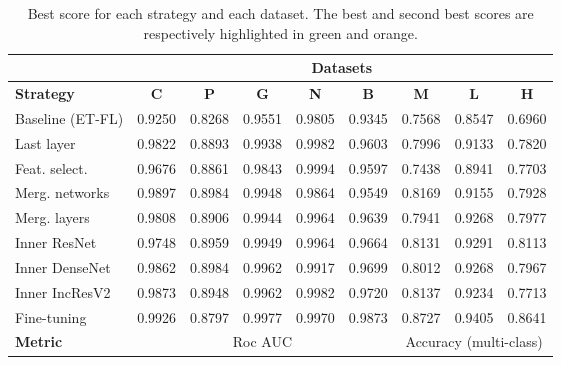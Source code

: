 \begin{table}
    \center
    \small
    \begin{tabular}{|l||c|c|c|c|c||c|c|c|}   
      \hline 
      & \multicolumn{8}{c|}{\textbf{Datasets}} \\
      \hline 
      \textbf{Strategy} & \textbf{C} & \textbf{P} & \textbf{G} & \textbf{N} & \textbf{B} & \textbf{M} & \textbf{L} & \textbf{H} \\
      \hline
      Baseline (ET-FL)      & 0.9250 & 0.8268 & 0.9551 & 0.9805	& 0.9345 & 0.7568 & 0.8547 & 0.6960 \\
      Last layer    & 0.9822 & 0.8893 & 0.9938 & \cellcolor{Dandelion}0.9982 & 0.9603 & 0.7996 & 0.9133	& 0.7820 \\
      Feat. select.	& 0.9676	& 0.8861	& 0.9843	& \cellcolor{LimeGreen}0.9994	& 0.9597	& 0.7438	& 0.8941	& 0.7703 \\
      Merg. networks	& \cellcolor{Dandelion}0.9897	& \cellcolor{LimeGreen}0.8984	& 0.9948	& 0.9864	& 0.9549	& \cellcolor{Dandelion}0.8169	& 0.9155	& 0.7928 \\
      Merg. layers	& 0.9808	& 0.8906	& 0.9944	& 0.9964	& 0.9639	& 0.7941	& 0.9268	& 0.7977 \\
      Inner ResNet	& 0.9748	& \cellcolor{Dandelion}0.8959	& 0.9949	& 0.9964	& 0.9664	& 0.8131	& \cellcolor{Dandelion}0.9291	& \cellcolor{Dandelion}0.8113 \\
      Inner DenseNet	& 0.9862	& \cellcolor{LimeGreen}0.8984	& \cellcolor{Dandelion}0.9962	& 0.9917	& 0.9699	& 0.8012	& 0.9268	& 0.7967 \\
      Inner IncResV2	& 0.9873	& 0.8948	& \cellcolor{Dandelion}0.9962	& \cellcolor{Dandelion}0.9982	& \cellcolor{Dandelion}0.9720	& 0.8137	& 0.9234	& 0.7713 \\
       Fine-tuning		& \cellcolor{LimeGreen}0.9926	& 0.8797	& \cellcolor{LimeGreen}0.9977	& 0.9970	& \cellcolor{LimeGreen}0.9873	& \cellcolor{LimeGreen}0.8727	& \cellcolor{LimeGreen}0.9405	& \cellcolor{LimeGreen}0.8641 \\
      \hline
      \textbf{Metric} & \multicolumn{5}{c||}{Roc AUC} & \multicolumn{3}{c|}{Accuracy (multi-class)} \\
      \hline
    \end{tabular}
      \caption{Best score for each strategy and each dataset. The best and second best scores are respectively highlighted in green and orange.}
    \label{tab:comp:res_best_scores_per_strategy}
\end{table}

